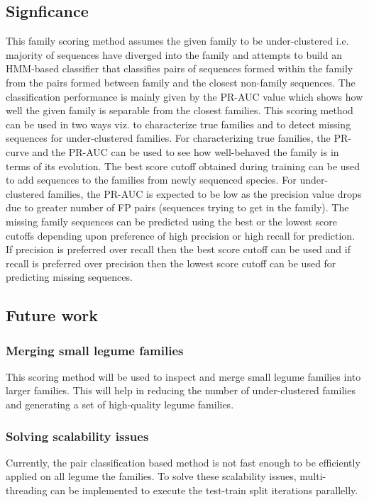 \documentclass{article}
\begin{document}
		\subsection{Signficance}
		This family scoring method assumes the given family to be under-clustered i.e. majority of sequences have diverged into the family and attempts to build an HMM-based classifier that classifies pairs of sequences formed within the family from the pairs formed between family and the closest non-family sequences. The classification performance is mainly given by the PR-AUC value which shows how well the given family is separable from the closest families. This scoring method can be used in two ways viz. to characterize true families and to detect missing sequences for under-clustered families. For characterizing true families, the PR-curve and the PR-AUC can be used to see how well-behaved the family is in terms of its evolution. The best score cutoff obtained during training can be used to add sequences to the families from newly sequenced species. For under-clustered families, the PR-AUC is expected to be low as the precision value drops due to greater number of FP pairs (sequences trying to get in the family). The missing family sequences can be predicted using the best or the lowest score cutoffs depending upon preference of  high precision or high recall for prediction. If precision is preferred over recall then the best score cutoff can be used and if recall is preferred over precision then the lowest score cutoff can be used for predicting missing sequences.
		
		\subsection{Future work}
			\subsubsection{Merging small legume families}
			This scoring method will be used to inspect and merge small legume families into larger families. This will help in reducing the number of under-clustered families and generating a set of high-quality legume families.
			\subsubsection{Solving scalability issues}
			Currently, the pair classification based method is not fast enough to be efficiently applied on all legume the families. To solve these scalability issues, multi-threading can be implemented to execute the test-train split iterations parallelly. 
			
\end{document}

